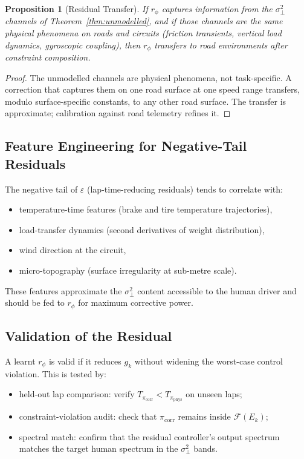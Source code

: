 \documentclass[11pt,twocolumn]{article}
\newtheorem{proposition}[theorem]{Proposition}
\theoremstyle{definition}
\theoremstyle{remark}
\newcommand{\Feas}{\mathcal{F}}
\begin{document}
\begin{proposition}[Residual Transfer]\label{prop:residual-transfer}
If $r_\phi$ captures information from the $\sigma^2_{\perp}$ channels of Theorem~\ref{thm:unmodelled}, and if those channels are the same physical phenomena on roads and circuits (friction transients, vertical load dynamics, gyroscopic coupling), then $r_\phi$ transfers to road environments after constraint composition.
\end{proposition}

\begin{proof}
The unmodelled channels are physical phenomena, not task-specific. A correction that captures them on one road surface at one speed range transfers, modulo surface-specific constants, to any other road surface. The transfer is approximate; calibration against road telemetry refines it.
\end{proof}

\subsection{Feature Engineering for Negative-Tail Residuals}

The negative tail of $\varepsilon$ (lap-time-reducing residuals) tends to correlate with:
\begin{itemize}[leftmargin=*,itemsep=2pt]
\item temperature-time features (brake and tire temperature trajectories),
\item load-transfer dynamics (second derivatives of weight distribution),
\item wind direction at the circuit,
\item micro-topography (surface irregularity at sub-metre scale).
\end{itemize}

These features approximate the $\sigma^2_{\perp}$ content accessible to the human driver and should be fed to $r_\phi$ for maximum corrective power.

\subsection{Validation of the Residual}

A learnt $r_\phi$ is valid if it reduces $g_k$ without widening the worst-case control violation. This is tested by:
\begin{itemize}[leftmargin=*,itemsep=2pt]
\item held-out lap comparison: verify $T_{\pi_{\mathrm{corr}}} < T_{\pi_{\mathrm{phys}}}$ on unseen laps;
\item constraint-violation audit: check that $\pi_{\mathrm{corr}}$ remains inside $\Feas(E_k)$;
\item spectral match: confirm that the residual controller's output spectrum matches the target human spectrum in the $\sigma^2_{\perp}$ bands.
\end{itemize}
\end{document}
